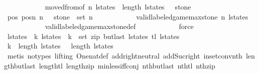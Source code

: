 \begin{isabellebody}
\ \ \ \ \ \ \ \ \ \ \isamarkupfalse%
\ moved{\isacharunderscore}from{\isacharbrackleft}of\ n\ l{\isacharunderscore}states\ {}\ {\isachardoublequoteopen}length\ l{\isacharunderscore}states\ {\isacharminus}\ {}{\isachardoublequoteclose}\ stone{\isacharbrackright}\isanewline
\ \ \ \ \ \ \ \ \ \ \isamarkupfalse%
\ pos{}\ posn\ {\isacharbackquoteopen}n\ {\isachargreater}\ {}{\isacharbackquoteclose}\ {\isacharbackquoteopen}stone\ {\isasymin}\ set\ {\isacharbrackleft}{}{\isachardot}{\isachardot}{\isacharless}n{\isacharbrackright}{\isacharbackquoteclose}\isanewline
\ \ \ \ \ \ \ \ \ \ \isamarkupfalse%
\ {\isacharbackquoteopen}valid{\isacharunderscore}labeled{\isacharunderscore}game{\isacharunderscore}max{\isacharunderscore}stone\ n\ l{\isacharunderscore}states{\isacharbackquoteclose}\isanewline
\ \ \ \ \ \ \ \ \ \ \isamarkupfalse%
\ valid{\isacharunderscore}labeled{\isacharunderscore}game{\isacharunderscore}max{\isacharunderscore}stone{\isacharunderscore}def\isanewline
\ \ \ \ \ \ \ \ \ \ \isamarkupfalse%
\ force\isanewline
\ \ \ \ \ \ \ \ \isamarkupfalse%
\isanewline
\ \ \ \ \ \ \ \ \isamarkupfalse%
\ {\isachardoublequoteopen}{\isacharparenleft}l{\isacharunderscore}states\ {\isacharbang}\ k{\isacharcomma}\ l{\isacharunderscore}states\ {\isacharbang}\ {\isacharparenleft}k{\isacharplus}{}{\isacharparenright}{\isacharparenright}\ {\isasymin}\ set\ {\isacharparenleft}zip\ {\isacharparenleft}butlast\ l{\isacharunderscore}states{\isacharparenright}\ {\isacharparenleft}tl\ l{\isacharunderscore}states{\isacharparenright}{\isacharparenright}{\isachardoublequoteclose}\isanewline
\ \ \ \ \ \ \ \ \ \ \isamarkupfalse%
\ {\isacharbackquoteopen}k\ {\isacharless}\ length\ l{\isacharunderscore}states\ {\isacharminus}\ {}{\isacharbackquoteclose}\ {\isacharbackquoteopen}length\ l{\isacharunderscore}states\ {\isasymge}\ {}{\isacharbackquoteclose}\isanewline
\ \ \ \ \ \ \ \ \ \ \isamarkupfalse%
\ {\isacharparenleft}metis\ {\isacharparenleft}no{\isacharunderscore}types{\isacharcomma}\ lifting{\isacharparenright}\ One{\isacharunderscore}nat{\isacharunderscore}def\ add{\isachardot}right{\isacharunderscore}neutral\ add{\isacharunderscore}Suc{\isacharunderscore}right\ in{\isacharunderscore}set{\isacharunderscore}conv{\isacharunderscore}nth\ length{\isacharunderscore}butlast\ length{\isacharunderscore}tl\ length{\isacharunderscore}zip\ min{\isacharunderscore}less{\isacharunderscore}iff{\isacharunderscore}conj\ nth{\isacharunderscore}butlast\ nth{\isacharunderscore}tl\ nth{\isacharunderscore}zip{\isacharparenright}\isanewline

\end{isabellebody}
